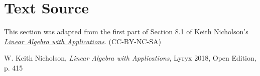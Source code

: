 \documentclass{ximera}
\begin{document}



\section*{Text Source} This section was adapted from the first part of Section 8.1 of Keith Nicholson's \href{https://open.umn.edu/opentextbooks/textbooks/linear-algebra-with-applications}{\it Linear Algebra with Applications}. (CC-BY-NC-SA)

W. Keith Nicholson, {\it Linear Algebra with Applications}, Lyryx 2018, Open Edition, p. 415 
\end{document}
